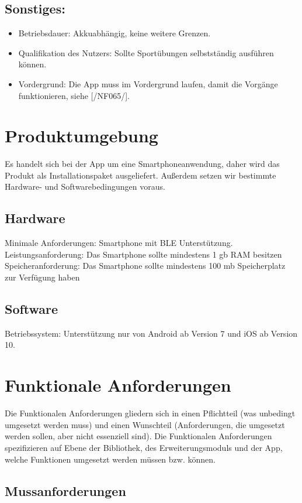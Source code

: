 \documentclass[a4paper,12pt]{article}
\begin{document}
    \subsection{Sonstiges:}
    \begin{itemize}
      \item \textsf{Betriebsdauer:} \glqq Akkuabhängig\grqq, keine weitere Grenzen.
      \item \textsf{Qualifikation des Nutzers:} Sollte Sportübungen selbstständig ausführen können.
      \item \textsf{Vordergrund:} Die App muss im Vordergrund laufen, damit die Vorgänge funktionieren, siehe [/NF065/].
    \end{itemize}
      
\section{Produktumgebung}
Es handelt sich bei der App um eine Smartphoneanwendung, daher wird das Produkt als Installationspaket ausgeliefert. Außerdem setzen wir bestimmte Hardware- und Softwarebedingungen voraus.
\subsection{Hardware} 
	\textsf{Minimale Anforderungen:} Smartphone mit \Gls{BLE} Unterstützung.
	\textsf{Leistungsanforderung:} Das Smartphone sollte mindestens 1 gb RAM besitzen
	\textsf{Speicheranforderung:} Das Smartphone sollte mindestens 100 mb Speicherplatz zur Verfügung haben
\subsection{Software} \textsf{Betriebssystem:} Unterstützung nur von Android ab Version 7 und iOS ab Version 10.

\section{Funktionale Anforderungen}
Die Funktionalen Anforderungen gliedern sich in einen Pflichtteil (was unbedingt umgesetzt werden muss) und einen Wunschteil (Anforderungen, die umgesetzt werden sollen, aber nicht essenziell sind). Die Funktionalen Anforderungen spezifizieren auf Ebene der Bibliothek, des Erweiterungsmoduls und der App, welche Funktionen umgesetzt werden müssen bzw. können. 
  \subsection{Mussanforderungen}
\end{document}
